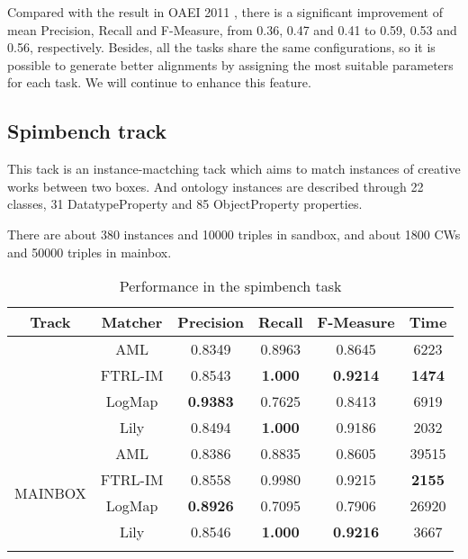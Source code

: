 \documentclass{llncs}
\begin{document}
Compared with the result in OAEI 2011 \cite{lily_oaei2011}, there is a significant improvement of mean Precision, Recall and F-Measure, from 0.36, 0.47 and 0.41 to 0.59, 0.53 and 0.56, respectively. Besides, all the tasks share the same configurations, so it is possible to generate better alignments by assigning the most suitable parameters for each task. We will continue to enhance this feature. \par

\subsection{Spimbench track}
This tack is an instance-mactching tack which aims to match instances of creative works between two boxes. And ontology instances are described through 22 classes, 31 DatatypeProperty and 85 ObjectProperty properties. \par
There are about 380 instances and 10000 triples in sandbox, and about 1800 CWs and 50000 triples in mainbox.\par
\begin{table}[H]
\caption{Performance in the spimbench task} \label{tab:perf_im_author_dis}
\centering
\begin{tabular}{c|c|c|c|c|c}
\Xhline{1.5pt}
Track & Matcher & Precision & Recall & F-Measure & Time  \\ \hline
\Xhline{0.5pt}
\multirow{4}{*}{SANDBOX } & AML & 0.8349 & 0.8963 & 0.8645 & 6223 \\ 
\cline{2-6}
& FTRL-IM & 0.8543 & \textbf{1.000} & \textbf{0.9214} & \textbf{1474} \\ 
\cline{2-6}
& LogMap & \textbf{0.9383} & 0.7625 & 0.8413 & 6919 \\ 
\cline{2-6}
& Lily & 0.8494 & \textbf{1.000} & 0.9186 & 2032 \\ 
\hline

\multirow{4}{*}{MAINBOX} & AML & 0.8386 & 0.8835 & 0.8605 & 39515 \\ 
\cline{2-6}
& FTRL-IM & 0.8558 & 0.9980 & 0.9215 & \textbf{2155} \\ 
\cline{2-6}
& LogMap & \textbf{0.8926} & 0.7095 & 0.7906 & 26920 \\
\cline{2-6}
& Lily & 0.8546 & \textbf{1.000} & \textbf{0.9216} & 3667 \\ 

\Xhline{1.5pt}

\end{tabular}
\end{table}
\end{document}
